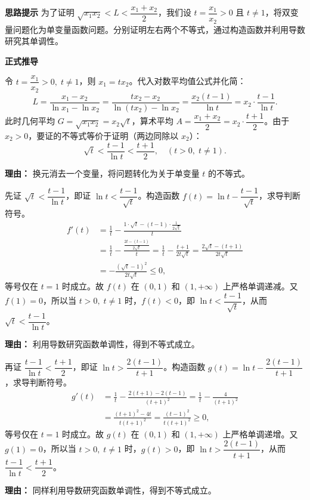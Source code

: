 \begin{proofbox}
\textbf{\textcolor{CProof}{思路提示}}
为了证明 $\sqrt{x_1 x_2} < L < \dfrac{x_1+x_2}{2}$，我们设 $t = \dfrac{x_1}{x_2} > 0$ 且 $t \neq 1$，将双变量问题化为单变量函数问题。分别证明左右两个不等式，通过构造函数并利用导数研究其单调性。

\medskip
\textbf{\textcolor{CProof}{正式推导}}
\begin{description}[style=nextline, leftmargin=2.8em, labelsep=0.5em, itemsep=0.55em]
    \item[\textbf{步骤一（换元简化）：}] 令 $t = \dfrac{x_1}{x_2} > 0,\; t \neq 1$，则 $x_1 = t x_2$。代入对数平均值公式并化简：
    \[
    L = \frac{x_1 - x_2}{\ln x_1 - \ln x_2}
    = \frac{t x_2 - x_2}{\ln(t x_2) - \ln x_2}
    = \frac{x_2(t-1)}{\ln t}
    = x_2 \cdot \frac{t-1}{\ln t}.
    \]
    此时几何平均 $G = \sqrt{x_1 x_2} = x_2 \sqrt{t}$，算术平均 $A = \dfrac{x_1+x_2}{2} = x_2 \cdot \dfrac{t+1}{2}$。由于 $x_2>0$，要证的不等式等价于证明（两边同除以 $x_2$）：
    \[
    \sqrt{t} < \frac{t-1}{\ln t} < \frac{t+1}{2},\quad (t>0,\; t\neq 1).
    \]
    \par\textbf{理由：} 换元消去一个变量，将问题转化为关于单变量 $t$ 的不等式。

    \item[\textbf{步骤二（证左半部）：}] 先证 $\sqrt{t} < \dfrac{t-1}{\ln t}$，即证 $\ln t < \dfrac{t-1}{\sqrt{t}}$。构造函数 $f(t) = \ln t - \dfrac{t-1}{\sqrt{t}}$，求导判断符号。
    \[
    \begin{aligned}
    f'(t) &= \frac{1}{t} - \frac{1\cdot\sqrt{t} - (t-1)\cdot\frac{1}{2\sqrt{t}}}{t} \\
          &= \frac{1}{t} - \frac{\frac{2t - (t-1)}{2\sqrt{t}}}{t}
          = \frac{1}{t} - \frac{t+1}{2t\sqrt{t}}
          = \frac{2\sqrt{t} - (t+1)}{2t\sqrt{t}} \\
          &= -\frac{(\sqrt{t}-1)^2}{2t\sqrt{t}} \le 0,
    \end{aligned}
    \]
    等号仅在 $t=1$ 时成立。故 $f(t)$ 在 $(0,1)$ 和 $(1,+\infty)$ 上严格单调递减。又 $f(1)=0$，所以当 $t>0,\; t\neq 1$ 时，$f(t)<0$，即 $\ln t < \dfrac{t-1}{\sqrt{t}}$，从而 $\sqrt{t} < \dfrac{t-1}{\ln t}$。
    \par\textbf{理由：} 利用导数研究函数单调性，得到不等式成立。

    \item[\textbf{步骤三（证右半部）：}] 再证 $\dfrac{t-1}{\ln t} < \dfrac{t+1}{2}$，即证 $\ln t > \dfrac{2(t-1)}{t+1}$。构造函数 $g(t) = \ln t - \dfrac{2(t-1)}{t+1}$，求导判断符号。
    \[
    \begin{aligned}
    g'(t) &= \frac{1}{t} - \frac{2(t+1) - 2(t-1)}{(t+1)^2}
          = \frac{1}{t} - \frac{4}{(t+1)^2} \\
          &= \frac{(t+1)^2 - 4t}{t(t+1)^2}
          = \frac{(t-1)^2}{t(t+1)^2} \ge 0,
    \end{aligned}
    \]
    等号仅在 $t=1$ 时成立。故 $g(t)$ 在 $(0,1)$ 和 $(1,+\infty)$ 上严格单调递增。又 $g(1)=0$，所以当 $t>0,\; t\neq 1$ 时，$g(t)>0$，即 $\ln t > \dfrac{2(t-1)}{t+1}$，从而 $\dfrac{t-1}{\ln t} < \dfrac{t+1}{2}$。
    \par\textbf{理由：} 同样利用导数研究函数单调性，得到不等式成立。


\end{description}
\end{proofbox}

